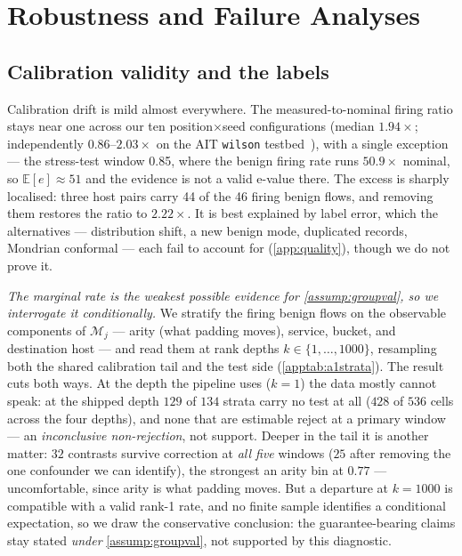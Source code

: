 \documentclass[conference]{IEEEtran}
\begin{document}
\section{Robustness and Failure Analyses}\label{sec:robustness}

\subsection{Calibration validity and the labels}\label{sec:tail}

Calibration drift is mild almost everywhere. The measured-to-nominal firing ratio stays near one
across our ten position$\times$seed configurations (median $1.94\times$; independently $0.86$--$2.03\times$
on the AIT \texttt{wilson} testbed~\cite{aitlds}), with a single exception --- the stress-test window
0.85, where the benign firing rate runs $50.9\times$ nominal, so $\mathbb{E}[e]\approx51$ and the
evidence is not a valid e-value there. The excess is sharply localised: three host pairs carry 44 of
the 46 firing benign flows, and removing them restores the ratio to $2.22\times$. It is best explained
by label error, which the alternatives --- distribution shift, a new benign mode, duplicated records,
Mondrian conformal --- each fail to account for (\cref{app:quality}), though we do not prove it.

\emph{The marginal rate is the weakest possible evidence for \cref{assump:groupval}, so we interrogate
it conditionally.} We stratify the firing benign flows on the observable components of $\mathcal{M}_j$
--- arity (what padding moves), service, bucket, and destination host --- and read them at rank depths
$k\in\{1,\dots,1000\}$, resampling both the shared calibration tail and the test side
(\cref{apptab:a1strata}). The result cuts both ways. At the depth the pipeline uses ($k=1$) the data
mostly cannot speak: at the shipped depth $129$ of $134$ strata carry no test at all ($428$ of $536$
cells across the four depths), and none that are estimable reject at a
primary window --- an \emph{inconclusive non-rejection}, not support. Deeper in the tail it is
another matter: $32$ contrasts survive correction at \emph{all five} windows ($25$ after removing the
one confounder we can identify), the strongest an arity bin at $0.77$ --- uncomfortable, since arity is
what padding moves. But a departure at $k=1000$ is compatible with a valid rank-1 rate, and no finite
sample identifies a conditional expectation, so we draw the conservative conclusion: the
guarantee-bearing claims stay stated \emph{under} \cref{assump:groupval}, not supported by this
diagnostic.
\end{document}
